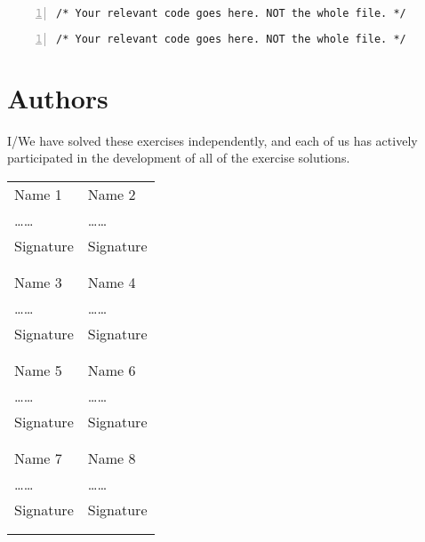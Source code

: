 \documentclass{article}
\begin{document}
\begin{lstlisting}[basicstyle=\small\sffamily,
keywords={break,case,const,continue,default,else,enum,
for,if,return,switch,while,do,long,void,int,float,double,
char,struct,typedef,include,size\_t},
keywordstyle={\color{blue}},
comment={[l]{//}}, morecomment={[s]{/*}{*/}}, commentstyle=\itshape,
columns={[l]flexible}, numbers=left, numberstyle=\tiny,
frameround=fftt, frame=shadowbox, captionpos=b,
caption={Cycle 2: Blocking, no deadlock.},
label=LST:cycle2]
/* Your relevant code goes here. NOT the whole file. */
\end{lstlisting}

\begin{lstlisting}[basicstyle=\small\sffamily,
keywords={break,case,const,continue,default,else,enum,
for,if,return,switch,while,do,long,void,int,float,double,
char,struct,typedef,include,size\_t},
keywordstyle={\color{blue}},
comment={[l]{//}}, morecomment={[s]{/*}{*/}}, commentstyle=\itshape,
columns={[l]flexible}, numbers=left, numberstyle=\tiny,
frameround=fftt, frame=shadowbox, captionpos=b,
caption={Cycle 3: Non-blocking, no deadlock.},
label=LST:cycle3]
/* Your relevant code goes here. NOT the whole file. */
\end{lstlisting}



\newpage
\section{Authors}
I/We have solved these exercises independently, and each of us has actively
participated in the development of all of the exercise solutions.
\vspace{1cm}

\noindent
\begin{tabular}{p{70mm}p{70mm}}

%
%

Name 1 & Name 2 \\
\dots\dotfill\dots & \dots\dotfill\dots \\
Signature & Signature \\
& \\
& \\

Name 3 & Name 4 \\
\dots\dotfill\dots & \dots\dotfill\dots \\
Signature & Signature \\
& \\
& \\

Name 5 & Name 6 \\
\dots\dotfill\dots & \dots\dotfill\dots \\
Signature & Signature \\
& \\
& \\

Name 7 & Name 8 \\
\dots\dotfill\dots & \dots\dotfill\dots \\
Signature & Signature \\
& \\
& \\
\end{tabular}
\end{document}

